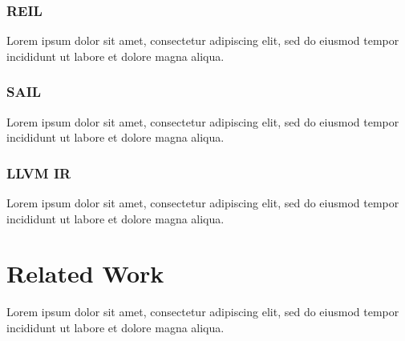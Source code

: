 \documentclass[12pt, a4paper]{article}
\begin{document}

\subsubsection{REIL}

%


Lorem ipsum dolor sit amet, consectetur adipiscing elit, sed do eiusmod tempor incididunt ut labore et dolore magna aliqua.


\subsubsection{SAIL}


Lorem ipsum dolor sit amet, consectetur adipiscing elit, sed do eiusmod tempor incididunt ut labore et dolore magna aliqua.


\subsubsection{LLVM IR}

Lorem ipsum dolor sit amet, consectetur adipiscing elit, sed do eiusmod tempor incididunt ut labore et dolore magna aliqua.


\section{Related Work}

Lorem ipsum dolor sit amet, consectetur adipiscing elit, sed do eiusmod tempor incididunt ut labore et dolore magna aliqua.
\end{document}
